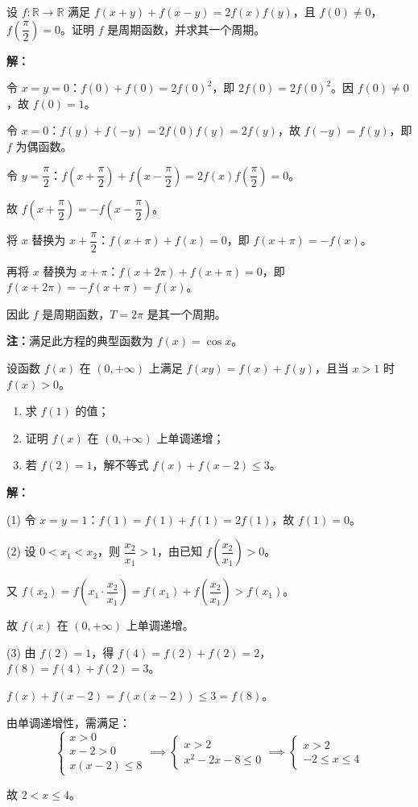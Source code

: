\documentclass[12pt,a4paper]{ctexart}
\begin{document}
\begin{examplebox}[例3]
设 $f:\mathbb{R}\to\mathbb{R}$ 满足 $f(x+y)+f(x-y)=2f(x)f(y)$，且 $f(0)\ne0$，$f\!\left(\dfrac{\pi}{2}\right)=0$。证明 $f$ 是周期函数，并求其一个周期。

\medskip
\textbf{解：}

令 $x=y=0$：$f(0)+f(0)=2f(0)^2$，即 $2f(0)=2f(0)^2$。因 $f(0)\ne0$，故 $f(0)=1$。

令 $x=0$：$f(y)+f(-y)=2f(0)f(y)=2f(y)$，故 $f(-y)=f(y)$，即 $f$ 为偶函数。

令 $y=\dfrac{\pi}{2}$：$f\!\left(x+\dfrac{\pi}{2}\right)+f\!\left(x-\dfrac{\pi}{2}\right)=2f(x)f\!\left(\dfrac{\pi}{2}\right)=0$。

故 $f\!\left(x+\dfrac{\pi}{2}\right)=-f\!\left(x-\dfrac{\pi}{2}\right)$。

将 $x$ 替换为 $x+\dfrac{\pi}{2}$：$f(x+\pi)+f(x)=0$，即 $f(x+\pi)=-f(x)$。

再将 $x$ 替换为 $x+\pi$：$f(x+2\pi)+f(x+\pi)=0$，即 $f(x+2\pi)=-f(x+\pi)=f(x)$。

因此 $f$ 是周期函数，$\boxed{T=2\pi}$ 是其一个周期。

\medskip
\textbf{注：}满足此方程的典型函数为 $f(x)=\cos x$。
\end{examplebox}

\begin{examplebox}[例4]
设函数 $f(x)$ 在 $(0,+\infty)$ 上满足 $f(xy)=f(x)+f(y)$，且当 $x>1$ 时 $f(x)>0$。
\begin{enumerate}[label=(\arabic*)]
  \item 求 $f(1)$ 的值；
  \item 证明 $f(x)$ 在 $(0,+\infty)$ 上单调递增；
  \item 若 $f(2)=1$，解不等式 $f(x)+f(x-2)\le3$。
\end{enumerate}

\medskip
\textbf{解：}

(1) 令 $x=y=1$：$f(1)=f(1)+f(1)=2f(1)$，故 $f(1)=0$。

(2) 设 $0<x_1<x_2$，则 $\dfrac{x_2}{x_1}>1$，由已知 $f\!\left(\dfrac{x_2}{x_1}\right)>0$。

又 $f(x_2)=f\!\left(x_1\cdot\dfrac{x_2}{x_1}\right)=f(x_1)+f\!\left(\dfrac{x_2}{x_1}\right)>f(x_1)$。

故 $f(x)$ 在 $(0,+\infty)$ 上单调递增。

(3) 由 $f(2)=1$，得 $f(4)=f(2)+f(2)=2$，$f(8)=f(4)+f(2)=3$。

$f(x)+f(x-2)=f(x(x-2))\le3=f(8)$。

由单调递增性，需满足：
\[\begin{cases} x>0 \\ x-2>0 \\ x(x-2)\le8 \end{cases}\implies\begin{cases} x>2 \\ x^2-2x-8\le0 \end{cases}\implies\begin{cases} x>2 \\ -2\le x\le4 \end{cases}\]

故 $\boxed{2<x\le4}$。
\end{examplebox}
\end{document}
